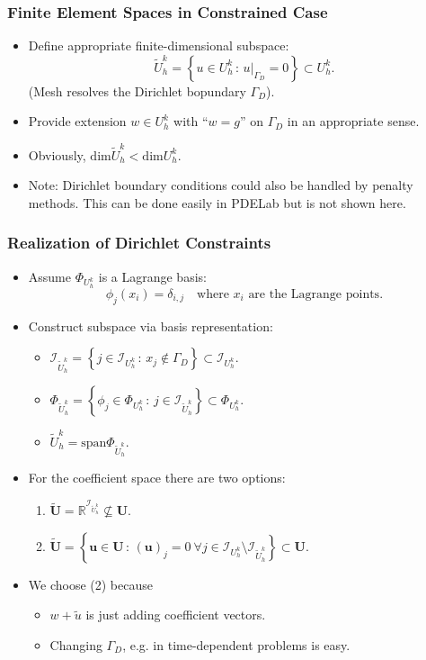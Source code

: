 \begin{frame}
\frametitle{Finite Element Spaces in Constrained Case}
\begin{itemize}
\item Define appropriate finite-dimensional subspace:
\begin{equation*}
\tilde{U}_h^k = \left \{ u \in U_h^k \,:\, u|_{\Gamma_D} = 0 \right\} \subset U_h^k.
\end{equation*}
(Mesh resolves the Dirichlet bopundary $\Gamma_D$).
\item Provide extension $w\in U_h^k$ with ``$w=g$'' on $\Gamma_D$ in an appropriate sense.
\item Obviously, $\text{dim}\tilde{U}_h^k < \text{dim} U_h^k$.
\item Note: Dirichlet boundary conditions could also be handled by penalty methods. 
This can be done easily in PDELab but is not shown here. 
\end{itemize}
\end{frame}

\begin{frame}
\frametitle{Realization of Dirichlet Constraints}
\begin{itemize}
\item Assume $\Phi_{U_h^k}$ is a Lagrange basis: 
\begin{equation*}
\phi_j(x_i)=\delta_{i,j} \quad\text{where $x_i$ are the Lagrange points}.
\end{equation*}
\item Construct subspace via basis representation:
\begin{itemize}
\item $\mathcal{I}_{\tilde{U}_h^k} = \left\{ j\in \mathcal{I}_{U_h^k} \,:\, 
x_j \not\in \Gamma_D \right\} \subset \mathcal{I}_{U_h^k}$.
\item $\Phi_{\tilde{U}_h^k} = \left\{ \phi_j\in \Phi_{U_h^k} \,:\, 
j \in \mathcal{I}_{\tilde{U}_h^k} \right\} \subset \Phi_{U_h^k}$.
\item $\tilde{U}_h^k = \text{span}\Phi_{\tilde{U}_h^k}$.
\end{itemize}
\item For the coefficient space there are two options:
\begin{enumerate}
\item $\tilde{\mathbf{U}} = \mathbb{R}^{\mathcal{I}_{\tilde{U}_h^k}} \not\subseteq \mathbf{U}$.
\item $\tilde{\mathbf{U}} = \left\{ \mathbf{u}\in\mathbf{U} \,:\, (\mathbf{u})_j = 0 \  \forall
j \in \mathcal{I}_{U_h^k} \setminus \mathcal{I}_{\tilde{U}_h^k} \right\} \subset \mathbf{U}$. 
\end{enumerate}
\item We choose (2) because
\begin{itemize}
\item $w + \tilde{u}$ is just adding coefficient vectors.
\item Changing $\Gamma_D$, e.g. in time-dependent problems is easy.
\end{itemize}
\end{itemize}
\end{frame}


